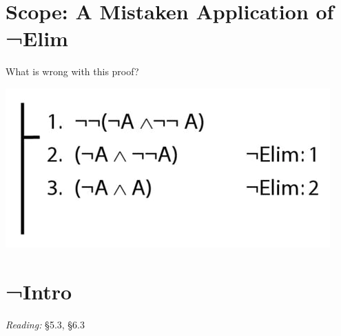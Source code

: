 \documentclass[12pt]{extarticle}
\begin{document}
\begin{multicols*}{3}
 
\section{Scope: A Mistaken Application of ¬Elim}
 
What is wrong with this proof?
 
\begin{center}
\includegraphics[scale=0.3]{img/proof_negation_elim_wrong.png}
\end{center}



\vfill


 
\section{¬Intro}
 
\emph{Reading:} §5.3, §6.3
 

\end{multicols*}
\end{document}

